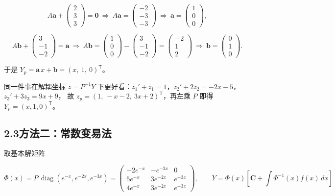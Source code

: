 \documentclass[11pt]{ctexart}
\newcommand{\vect}[1]{\boldsymbol{#1}}
\begin{document}
\[
A\vect a+\begin{pmatrix}2\\3\\3\end{pmatrix}=\vect 0
\ \Longrightarrow\
A\vect a=\begin{pmatrix}-2\\-3\\-3\end{pmatrix}
\ \Longrightarrow\
\vect a=\begin{pmatrix}1\\0\\0\end{pmatrix},
\]

\[
A\vect b+\begin{pmatrix}3\\-1\\-2\end{pmatrix}=\vect a
\ \Longrightarrow\
A\vect b=\begin{pmatrix}1\\0\\0\end{pmatrix}-\begin{pmatrix}3\\-1\\-2\end{pmatrix}
=\begin{pmatrix}-2\\1\\2\end{pmatrix}
\ \Longrightarrow\
\vect b=\begin{pmatrix}0\\1\\0\end{pmatrix}.
\]

于是 $Y_p=\vect a\,x+\vect b=(x,\ 1,\ 0)^{\mathsf T}$。

同一件事在解耦坐标 $z=P^{-1}Y$ 下更好看：$z_1'+z_1=1$，$z_2'+2z_2=-2x-5$，$z_3'+3z_3=9x+9$，
故 $z_p=\left(1,\ -x-2,\ 3x+2\right)^{\mathsf T}$，再左乘 $P$ 即得 $Y_p=(x,1,0)^{\mathsf T}$。

\subsection*{2.3\quad 方法二：常数变易法}

取基本解矩阵

\[
\Phi(x)=P\,\operatorname{diag}\!\left(e^{-x},e^{-2x},e^{-3x}\right)
=
\begin{pmatrix}-2e^{-x} & -e^{-2x} & 0\\[2pt]
 5e^{-x} & 3e^{-2x} & e^{-3x}\\[2pt]
 4e^{-x} & 3e^{-2x} & e^{-3x}\end{pmatrix},
\qquad
Y=\Phi(x)\left[\vect C+\int \Phi^{-1}(x)f(x)\,dx\right]
\]
\end{document}
